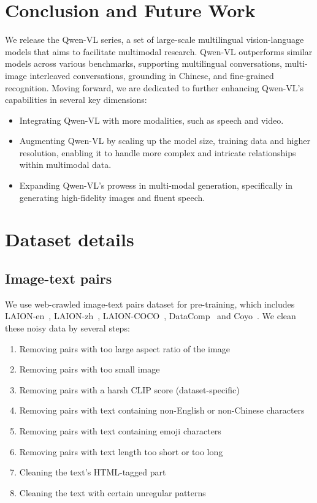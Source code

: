 \documentclass{article}
\begin{document}
\vspace{-0.2cm}
\section{Conclusion and Future Work}
We release the Qwen-VL series, a set of large-scale multilingual vision-language models that aims to facilitate multimodal research. Qwen-VL outperforms similar models across various benchmarks, supporting multilingual conversations, multi-image interleaved conversations, grounding in Chinese, and fine-grained recognition. 
Moving forward, we are dedicated to further enhancing Qwen-VL's capabilities in several key dimensions: 

\begin{itemize}
\item Integrating Qwen-VL with more modalities, such as speech and video. 
\item Augmenting Qwen-VL by scaling up the model size, training data and higher resolution, enabling it to handle more complex and intricate relationships within multimodal data.
\item Expanding Qwen-VL's prowess in multi-modal generation, specifically in generating high-fidelity images and fluent speech.
\end{itemize}


 






\clearpage
\newpage

\appendix
\section{Dataset details}
\label{app:dataset}



\subsection{Image-text pairs}
We use web-crawled image-text pairs dataset for pre-training, which includes LAION-en~\citep{laion5b}, LAION-zh~\citep{laion5b}, LAION-COCO~\citep{laioncoco}, DataComp~\citep{datacomp} and Coyo~\citep{coyo}. We clean these noisy data by several steps:
\begin{enumerate}
    \item Removing pairs with too large aspect ratio of the image
    \item Removing pairs with too small image
    \item Removing pairs with a harsh CLIP score (dataset-specific)
    \item Removing pairs with text containing non-English or non-Chinese characters
    \item Removing pairs with text containing emoji characters
    \item Removing pairs with text length too short or too long
    \item Cleaning the text's HTML-tagged part
    \item Cleaning the text with certain unregular patterns
\end{enumerate}
\end{document}
